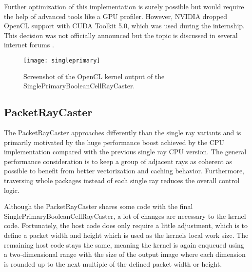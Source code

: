 Further optimization of this implementation is surely possible but would require the help of advanced tools like a GPU profiler. However, NVIDIA dropped OpenCL support with CUDA Toolkit 5.0, which was used during the internship. This decision was not officially announced but the topic is discussed in several internet forums \cite{dropped_opencl_support}.


\begin{figure}
\centering
\texttt{[image: singleprimary]}
\caption{Screenshot of the OpenCL kernel output of the SinglePrimaryBooleanCellRayCaster.}
\label{fig:singleprimary}
\end{figure}

\subsection{PacketRayCaster}

The PacketRayCaster approaches differently than the single ray variants and is primarily motivated by the huge performance boost achieved by the CPU implementation compared with the previous single ray CPU version. The general performance consideration is to keep a group of adjacent rays as coherent as possible to benefit from better vectorization and caching behavior. Furthermore, traversing whole packages instead of each single ray reduces the overall control logic.

Although the PacketRayCaster shares some code with the final SinglePrimaryBooleanCellRayCaster, a lot of changes are necessary to the kernel code. Fortunately, the host code does only require a little adjustment, which is to define a packet width and height which is used as the kernels local work size. The remaining host code stays the same, meaning the kernel is again enqueued using a two-dimensional range with the size of the output image where each dimension is rounded up to the next multiple of the defined packet width or height.

